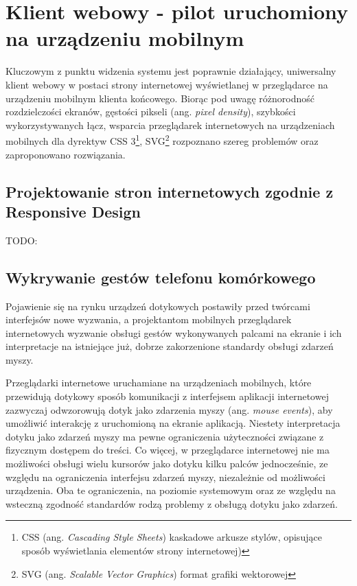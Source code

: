 \section{Klient webowy - pilot uruchomiony na urządzeniu mobilnym}

Kluczowym z punktu widzenia systemu jest poprawnie działający, uniwersalny klient webowy w postaci strony internetowej wyświetlanej w przeglądarce na urządzeniu mobilnym klienta końcowego. Biorąc pod uwagę różnorodność rozdzielczości ekranów, gęstości pikseli (ang. \emph{pixel density}), szybkości wykorzystywanych łącz, wsparcia przeglądarek internetowych na urządzeniach mobilnych dla dyrektyw CSS 3\footnote{CSS (ang. \emph{Cascading Style Sheets}) kaskadowe arkusze stylów, opisujące sposób wyświetlania elementów strony internetowej)}, SVG\footnote{SVG (ang. \emph{Scalable Vector Graphics}) format grafiki wektorowej} rozpoznano szereg problemów oraz zaproponowano rozwiązania.

\subsection{Projektowanie stron internetowych zgodnie z Responsive Design}

TODO:

\subsection{Wykrywanie gestów telefonu komórkowego}

Pojawienie się na rynku urządzeń dotykowych postawiły przed twórcami interfejsów nowe wyzwania, a projektantom mobilnych przeglądarek internetowych wyzwanie obsługi gestów wykonywanych palcami na ekranie i ich interpretacje na istniejące już, dobrze zakorzenione standardy obsługi zdarzeń myszy.

Przeglądarki internetowe uruchamiane na urządzeniach mobilnych, które przewidują dotykowy sposób komunikacji z interfejsem aplikacji internetowej zazwyczaj odwzorowują dotyk jako zdarzenia myszy (ang. \emph{mouse events}), aby umożliwić interakcję z uruchomioną na ekranie aplikacją. Niestety interpretacja dotyku jako zdarzeń myszy ma pewne ograniczenia użyteczności związane z fizycznym dostępem do treści. Co więcej, w przeglądarce internetowej nie ma możliwości obsługi wielu kursorów jako dotyku kilku palców jednocześnie, ze względu na ograniczenia interfejsu zdarzeń myszy, niezależnie od możliwości urządzenia. Oba te ograniczenia, na poziomie systemowym oraz ze względu na wsteczną zgodność standardów rodzą problemy z obsługą dotyku jako zdarzeń.

